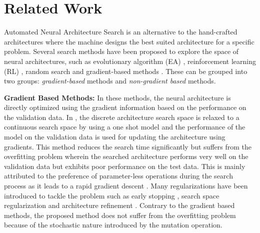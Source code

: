 \documentclass[final]{cvpr}
\begin{document}
\section{Related Work}
Automated Neural Architecture Search is an alternative to the  hand-crafted architectures where the
machine designs the best suited architecture for a specific problem. Several search methods have
been proposed to explore the space of neural architectures, such as evolutionary algorithm (EA)
\cite{real2019regularized}\cite{real2017large}\cite{liu2018hierarchical}\cite{xie2017genetic},
reinforcement learning (RL) \cite{zoph2016neural}\cite{zoph2018learning}\cite{pmlr-v80-pham18a},
random search\cite{li2019random} and gradient-based methods
\cite{liu2018darts}\cite{liu2018darts2}\cite{luo2018neural}\cite{chen2019progressive}\cite{Zela2020Understanding}.
These can be grouped into two groups: \textit{gradient-based} methods and \textit{non-gradient based}
methods.

\textbf{Gradient Based Methods:} In these methods, the neural architecture is directly optimized
using the gradient information based on the performance on the validation data. In
\cite{liu2018darts}\cite{liu2018darts2}, the discrete architecture search space is 
relaxed to a continuous search space by using a one shot model and the performance of the
model on the validation data is used for updating the architecture using gradients. This method
reduces the search time significantly but suffers from the overfitting problem wherein the searched
architecture performs very well on the validation data but exhibits poor performance on the test
data. This is mainly attributed to the preference of parameter-less operations during the search
process as it leads to a rapid gradient descent \cite{chen2019progressive}. Many regularizations
have been introduced to tackle the problem such as early stopping \cite{Zela2020Understanding},
search space regularization \cite{chen2019progressive} and architecture refinement
\cite{chen2019progressive}. Contrary to the gradient based methods, the proposed method does not
suffer from the overfitting problem because of the stochastic nature introduced by the mutation
operation.
\end{document}
